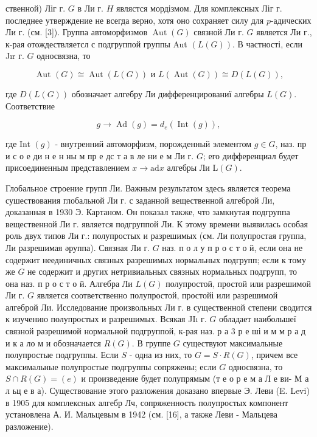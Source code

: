\documentclass[10pt]{article}
\begin{document}
ственной) Ліг г. $G$ в Ли г. $H$ являстся мордізмом. Для комплексных Ліг г. последнее утверждение не всегда верно, хотя оно сохраняет силу для $p$-адических Ли г. (см. [3]). Группа автоморфизмов $\operatorname{Aut}(G)$ связной Ли г. $G$ является Ли г., к-рая отождествляетсл с подгруппой группы Aut $(L(G))$. В частності, если Jır г. $G$ односвязна, то



\[

\text { Aut }(G) \cong \operatorname{Aut}(L(G)) \text { и } L(\operatorname{Aut}(G)) \cong D(L(G)),

\]



где $D(L(G))$ обозначает алгебру Ли дифференцированиї алгебры $L(G)$. Соответствие



\[

g \longrightarrow \operatorname{Ad}(g)=d_{e}(\operatorname{Int}(g)),

\]



где Int $(g)$ - внутренний автоморфизм, порожденный элементом $g \in G$, наз. пр и с о е ди н е н ны м пр е дс т а в ле ни е м Ли г. $G$; его дифференциал будет присоединенным представлением $x \rightarrow \mathrm{ad} x$ алгебры Ли $\mathrm{L}(G)$.



Глобальное строение групп Ли. Важным результатом здесь является теорема сушествования глобальной Ли г. с заданной вещественной алгеброй Ли, доказанная в 1930 Э. Картаном. Он показал также, что замкнутая подгруппа вещественной Ли г. является подгруппой Ли. К этому времени выявилась особая роль двух типов Ли г.: полупростых и разрешимых (см. Ли полупростая группа, Ли разрешимая әруппа). Связная Ли г. $G$ наз. п о л у п р о с т о й, если она не содержит неединичных связных разрешимых нормальных подгрупп; если к тому же $G$ не содержит и других нетривиальных связных нормальных подгрупп, то она наз. п р о с т о й. Алгебра Ли $L(G)$ полупростой, простой или разрешимой Ли г. $G$ является соответственно полупростой, простойі или разрешимой алгеброй Ли. Исследование произвольных Ли г. в существенной степени сводится к изучению полупростых и разрешимых. Всякая JIı г. $G$ обладает наибольшеї связной разрешимой нормальной подгруппой, к-рая наз. р а 3 р е ші и м м р а д и к а ло м и обозначается $R(G)$. В группе $G$ существуют максимальные полупростые подгруппы. Если $S$ - одна из них, то $G=S \cdot R(G)$, причем все максимальные полупростые подгруппы сопряжены; если $G$ односвязна, то $S \cap R(G)=(e)$ и произведение будет полупрямым (т е о р е м а Л е ви- М а л ьц е в а). Существование этого разложения доказано впервые Э. Леви (E. Levi) в 1905 для комплексных алгебр Лч, сопряженность полупростых компонент установлена А. И. Мальцевым в 1942 (см. [16], а также Леви - Мальцева разложение).
\end{document}

